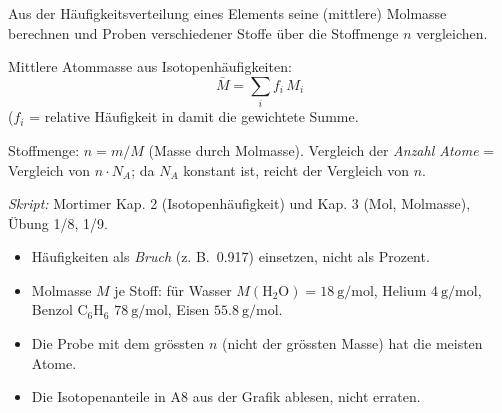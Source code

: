 

Aus der Häufigkeitsverteilung eines Elements seine (mittlere) Molmasse
berechnen und Proben verschiedener Stoffe über die Stoffmenge $n$ vergleichen.

\begin{werkzeugkasten}
Mittlere Atommasse aus Isotopenhäufigkeiten:
\begin{equation}
  \bar M = \sum_i f_i\,M_i
\end{equation}
($f_i$ = relative Häufigkeit in %
damit die gewichtete Summe.

Stoffmenge: $n = m/M$ (Masse durch Molmasse). Vergleich der \emph{Anzahl
Atome} = Vergleich von $n\cdot N_A$; da $N_A$ konstant ist, reicht der
Vergleich von $n$.

\textit{Skript:} Mortimer Kap. 2 (Isotopenhäufigkeit) und Kap. 3 (Mol,
Molmasse), Übung 1/8, 1/9.
\end{werkzeugkasten}

\begin{achtung}
\begin{itemize}
  \item Häufigkeiten als \emph{Bruch} (z. B.\ 0.917) einsetzen, nicht als Prozent.
  \item Molmasse $M$ je Stoff: für Wasser $M(\mathrm{H_2O})=18\ \mathrm{g/mol}$,
        Helium $4\ \mathrm{g/mol}$, Benzol $\mathrm{C_6H_6}$ $78\ \mathrm{g/mol}$,
        Eisen $55.8\ \mathrm{g/mol}$.
  \item Die Probe mit dem grössten $n$ (nicht der grössten Masse) hat die
        meisten Atome.
  \item Die Isotopenanteile in A8 aus der Grafik ablesen, nicht erraten.
\end{itemize}
\end{achtung}

